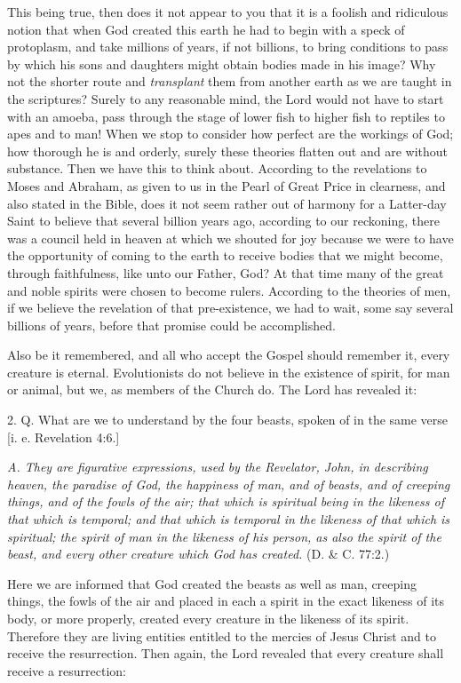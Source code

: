 This being true, then does it not appear to you that it is a foolish and ridiculous notion that
when God created this earth he had to begin with a speck of protoplasm, and take millions of
years, if not billions, to bring conditions to pass by which his sons and daughters might
obtain bodies made in his image? Why not the shorter route and \textit{transplant} them from
another earth as we are taught in the scriptures? Surely to any reasonable mind, the Lord
would not have to start with an amoeba, pass through the stage of lower fish to higher fish to
reptiles to apes and to man! When we stop to consider how perfect are the workings of God;
how thorough he is and orderly, surely these theories flatten out and are without substance.
Then we have this to think about. According to the revelations to Moses and Abraham, as
given to us in the Pearl of Great Price in clearness, and also stated in the Bible, does it not
seem rather out of harmony for a Latter-day Saint to believe that several billion years ago,
according to our reckoning, there was a council held in heaven at which we shouted for joy
because we were to have the opportunity of coming to the earth to receive bodies that we
might become, through faithfulness, like unto our Father, God? At that time many of the
great and noble spirits were chosen to become rulers. According to the theories of men, if we
believe the revelation of that pre-existence, we had to wait, some say several billions of
years, before that promise could be accomplished.

Also be it remembered, and all who accept the Gospel should remember it, every creature is
eternal. Evolutionists do not believe in the existence of spirit, for man or animal, but we, as
members of the Church do. The Lord has revealed it:

2. Q. What are we to understand by the four beasts, spoken of in the same verse [i. e.
Revelation 4:6.]

\textit{A. They are figurative expressions, used by the Revelator, John, in describing heaven, the
paradise of God, the happiness of man, and of beasts, and of creeping things, and of the
fowls of the air; that which is spiritual being in the likeness of that which is temporal; and
that which is temporal in the likeness of that which is spiritual; the spirit of man in the
likeness of his person, as also the spirit of the beast, and every other creature which God has
created.} (D. \& C. 77:2.)

Here we are informed that God created the beasts as well as man, creeping things, the fowls
of the air and placed in each a spirit in the exact likeness of its body, or more properly,
created every creature in the likeness of its spirit. Therefore they are living entities entitled to
the mercies of Jesus Christ and to receive the resurrection. Then again, the Lord revealed that
every creature shall receive a resurrection:


